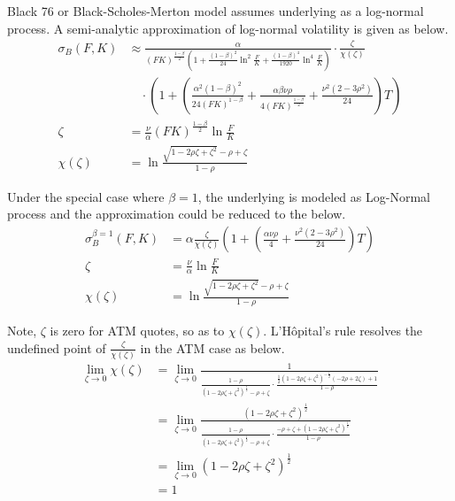 \documentclass{article}
\begin{document}
Black 76 or Black-Scholes-Merton model assumes underlying as a log-normal process.
A semi-analytic approximation of log-normal volatility is given as below.
\begin{subequations}
    \begin{align}
        \sigma_B{(F, K)} &\approx \frac{\alpha}{(FK)^{\frac{1 - \beta}{2}}\left(1 + \frac{\left(1 - \beta\right)^2}{24} \ln^2{\frac{F}{K}} + \frac{{\left(1 - \beta\right)}^{4}}{1920} \ln^4{\frac{F}{K}}\right)} \cdot \frac{\zeta}{\chi (\zeta)} \nonumber \\
        & \quad \cdot \left(1 + \left(\frac{\alpha^2 {\left(1 - \beta\right)}^{2}}{24 \left(F K\right)^{1 - \beta}} + \frac{\alpha \beta \nu \rho}{4 {\left(F K\right)}^{\frac{1 - \beta}{2}}} + \frac{\nu^2 \left(2 - 3 \rho^2\right)}{24}\right) T\right)\\
        \zeta &= \frac{\nu}{\alpha} {(F K)}^{\frac{1 - \beta}{2}} \ln{\frac{F}{K}} \\
        \chi(\zeta) &= \ln{\frac{\sqrt{1 - 2 \rho \zeta + {\zeta}^2} - \rho + \zeta}{1 - \rho}}
    \end{align}
\end{subequations}

Under the special case where $ \beta = 1 $, the underlying is modeled as Log-Normal process and the approximation could be reduced to the below.
\begin{subequations} \label{SABR_LogNormal_Beta_1}
    \begin{align}
        \sigma_B^{\beta = 1}{(F, K)} &= \alpha \frac{\zeta}{\chi(\zeta)} \left(1 + \left(\frac{\alpha \nu \rho}{4} + \frac{\nu^2 \left(2 - 3 \rho^2\right)}{24}\right) T \right) \\
        \zeta &= \frac{\nu}{\alpha} \ln{\frac{F}{K}} \\
        \chi(\zeta) &= \ln{\frac{\sqrt{1 - 2 \rho \zeta + \zeta^2} - \rho + \zeta}{1 - \rho}}
    \end{align}
\end{subequations}

Note, $ \zeta $ is zero for ATM quotes, so as to $ \chi(\zeta) $.
L'H\^opital's rule resolves the undefined point of $ \frac{\zeta}{\chi(\zeta)} $ in the ATM case as below.
\begin{align}
    \lim_{\zeta \to 0}{\chi(\zeta)} &= \lim_{\zeta \to 0}{\frac{1}{\frac{1 - \rho}{\left(1 - 2 \rho \zeta + \zeta^2\right)^{\frac{1}{2}} - \rho + \zeta} \cdot \frac{\frac{1}{2}\left(1 - 2 \rho \zeta + \zeta^2\right)^{-\frac{1}{2}}\left(-2\rho + 2 \zeta \right) + 1}{1 - \rho}}} \nonumber \\
    &= \lim_{\zeta \to 0}{\frac{\left(1 - 2 \rho \zeta + \zeta^2\right)^{\frac{1}{2}}}{\frac{1 - \rho}{\left(1 - 2 \rho \zeta + \zeta^2\right)^{\frac{1}{2}} - \rho + \zeta} \cdot \frac{-\rho + \zeta + \left(1 - 2 \rho \zeta + \zeta^2\right)^{\frac{1}{2}}}{1 - \rho}}} \nonumber \\
    &= \lim_{\zeta \to 0}{\left(1 - 2 \rho \zeta + \zeta^2\right)^{\frac{1}{2}}} \nonumber \\
    &= 1
\end{align}
\end{document}

